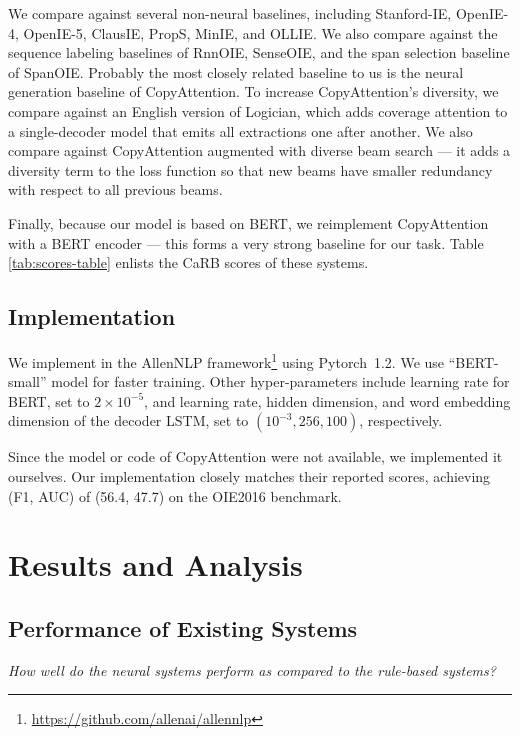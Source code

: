        We compare \shortname{} against several non-neural baselines, including Stanford-IE, OpenIE-4, OpenIE-5, ClausIE, PropS, MinIE, and OLLIE. We also compare against the sequence labeling baselines of RnnOIE, SenseOIE, and the span selection baseline of SpanOIE. Probably the most closely related baseline to us is the neural generation baseline of CopyAttention. To increase CopyAttention's diversity, we compare against an English version of Logician, which adds coverage attention to a single-decoder model that emits all extractions one after another. We also compare against CopyAttention augmented with diverse beam search \cite{diversebeam} --- it adds a diversity term to the loss function so that new beams have smaller redundancy with respect to all previous beams.

        Finally, because our model is based on BERT, we reimplement CopyAttention with a BERT encoder --- this forms a very strong baseline for our task. Table \ref{tab:scores-table} enlists the CaRB scores of these systems.

    \subsection{Implementation}

        We implement \shortname{} in the AllenNLP framework\footnote{\href{https://github.com/allenai/allennlp}{https://github.com/allenai/allennlp}} \citep{gardner2018allennlp} using Pytorch~1.2.  We use ``BERT-small'' model for faster training. Other hyper-parameters include learning rate for BERT, set to $2\times10^{-5}$, and learning rate, hidden dimension, and word embedding dimension of the decoder LSTM, set to $(10^{-3}, 256, 100)$, respectively.

        Since the model or code of CopyAttention \citep{cui&al18} were not available, we implemented it ourselves. Our implementation closely matches their reported scores, achieving (F1, AUC) of (56.4, 47.7) on the OIE2016 benchmark.

\section{Results and Analysis}

    \subsection{Performance of Existing Systems}

        \emph{How well do the neural systems perform as compared to the rule-based systems?}

